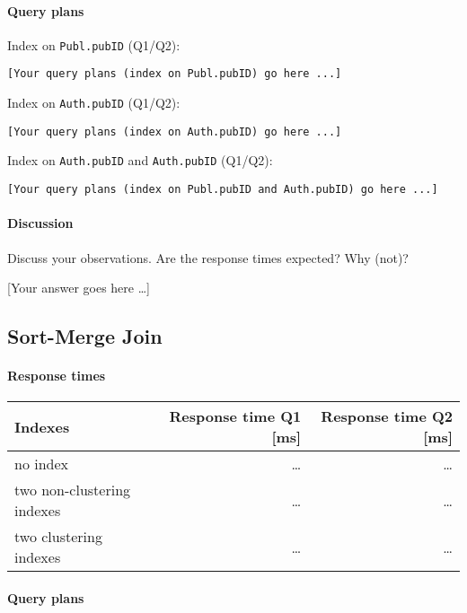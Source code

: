 \documentclass[11pt]{scrartcl}
\newcommand{\youranswerhere}{[Your answer goes here \ldots]}
\begin{document}
\paragraph{Query plans}\mbox{}

Index on \texttt{Publ.pubID} (Q1/Q2):

{\small
\parskip0pt\begin{verbatim}
[Your query plans (index on Publ.pubID) go here ...]
\end{verbatim}}

Index on \texttt{Auth.pubID} (Q1/Q2):

{\small
\parskip0pt\begin{verbatim}
[Your query plans (index on Auth.pubID) go here ...]
\end{verbatim}}

Index on \texttt{Auth.pubID} and \texttt{Auth.pubID} (Q1/Q2):

{\small
\parskip0pt\begin{verbatim}
[Your query plans (index on Publ.pubID and Auth.pubID) go here ...]
\end{verbatim}}

\paragraph{Discussion}

Discuss your observations. Are the response times expected? Why (not)?

\youranswerhere{}

\subsection*{Sort-Merge Join}

\paragraph{Response times}\mbox{}

\begin{table}[H]
  \centering
  \begin{tabular}{l|r|r}
    Indexes & Response time Q1 [ms] & Response time Q2 [ms] \tabularnewline
    \hline
    no index & \ldots & \ldots \tabularnewline
    two non-clustering indexes & \ldots & \ldots \tabularnewline
    two clustering indexes & \ldots & \ldots \tabularnewline
  \end{tabular}
\end{table}

\paragraph{Query plans}\mbox{}
\end{document}
